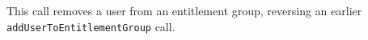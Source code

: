 This call removes a user from an entitlement group, reversing an earlier \verb+addUserToEntitlementGroup+ call.
